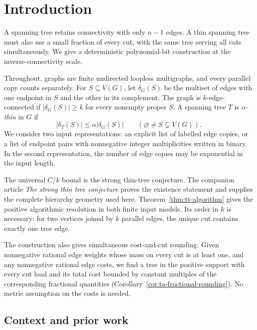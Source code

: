 \section{Introduction}
\label{sec:introduction}

A spanning tree retains connectivity with only $n-1$ edges. A thin
spanning tree must also use a small fraction of every cut, with the
same tree serving all cuts simultaneously. We give a deterministic polynomial-bit
construction at the inverse-connectivity scale.

Throughout, graphs are finite undirected loopless multigraphs, and
every parallel copy counts separately. For $S\subseteq V(G)$, let
$\delta_G(S)$ be the multiset of edges with one endpoint in $S$ and
the other in its complement. The graph is $k$-edge-connected if
$|\delta_G(S)|\ge k$ for every nonempty proper $S$. A spanning tree
$T$ is \emph{$\alpha$-thin} in $G$ if
\[
 |\delta_T(S)|\le\alpha|\delta_G(S)|
 \qquad(\varnothing\ne S\subsetneq V(G)).
\]
We consider two input representations: an explicit list of labelled
edge copies, or a list of endpoint pairs with nonnegative integer
multiplicities written in binary. In the second representation, the
number of edge copies may be exponential in the input length.



The universal $C/k$ bound is the strong thin-tree conjecture. The
companion article \emph{The strong thin tree conjecture}
\cite{ThinTreesCompanion} proves the existence statement and supplies
the complete hierarchy geometry used here. Theorem~\ref{thm:tt-algorithm}
gives the positive algorithmic resolution in both finite input
models. Its order in $k$ is necessary: for two vertices joined by
$k$ parallel edges, the unique cut contains exactly one tree edge.

The construction also gives simultaneous cost-and-cut rounding. Given
nonnegative rational edge weights whose mass on every cut is at least one, and any
nonnegative rational edge costs, we find a tree in the positive support
with every cut load and its total cost bounded by constant multiples of
the corresponding fractional quantities
(Corollary~\ref{cor:ta-fractional-rounding}). No metric assumption on
the costs is needed.

\subsection{Context and prior work}

